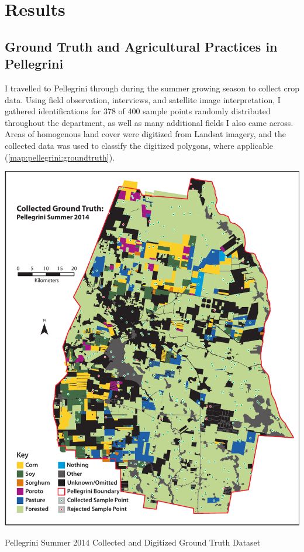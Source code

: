 \chapter{Results}
\label{chapter:results}

\section{Ground Truth and Agricultural Practices in Pellegrini}

I travelled to Pellegrini  through  during the summer growing season to collect crop data. Using field observation, interviews, and satellite image interpretation, I gathered identifications for 378 of 400 sample points randomly distributed throughout the department, as well as many additional fields I also came across. Areas of homogenous land cover were digitized from Landsat imagery, and the collected data was used to classify the digitized polygons, where applicable (\autoref{map:pellegrini:groundtruth}).
\begin{ssfigure}
  \centering
  \includegraphics[width=\textwidth]{Graphics/collecteddata.pdf}
  \caption{Pellegrini Summer 2014 Collected and Digitized Ground Truth Dataset}
  \label{map:pellegrini:groundtruth}
\end{ssfigure}
